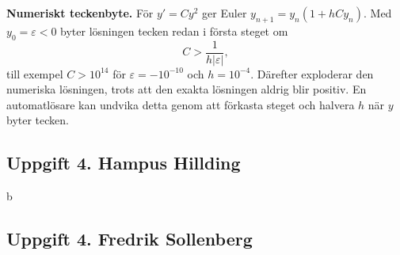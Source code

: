 \documentclass{article}
\begin{document}
\medskip
\textbf{Numeriskt teckenbyte.} För $y' = Cy^2$ ger Euler
$y_{n+1} = y_n(1 + hCy_n)$. Med $y_0 = \varepsilon < 0$ byter lösningen tecken
redan i första steget om
\[
  C > \frac{1}{h|\varepsilon|},
\]
till exempel $C > 10^{14}$ för $\varepsilon = -10^{-10}$ och $h = 10^{-4}$.
Därefter exploderar den numeriska lösningen, trots att den exakta lösningen
aldrig blir positiv. En automatlösare kan undvika detta genom att förkasta
steget och halvera $h$ när $y$ byter tecken.

\subsection*{Uppgift 4. Hampus Hillding}
b

\subsection*{Uppgift 4. Fredrik Sollenberg}
\end{document}
